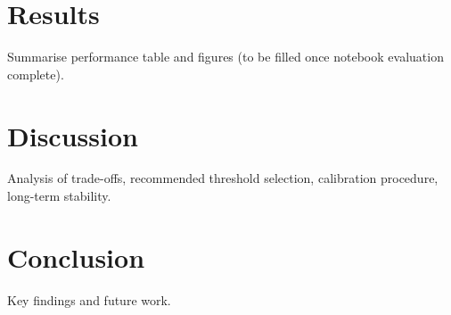\documentclass{article} %
\begin{document}
\section{Results}
Summarise performance table and figures (to be filled once notebook evaluation complete).

\section{Discussion}
Analysis of trade-offs, recommended threshold selection, calibration procedure, long-term stability.

\section{Conclusion}
Key findings and future work.



\end{document}
